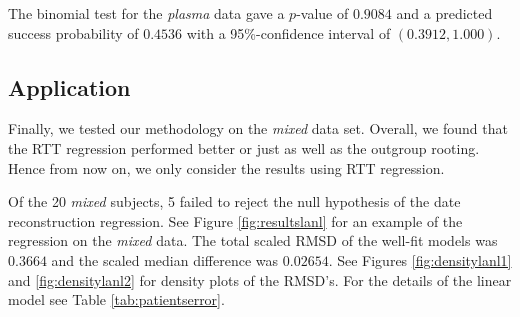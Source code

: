 \documentclass[12pt]{article}
\begin{document}
The binomial test for the \emph{plasma} data gave a $p$-value of $0.9084$ and a predicted success probability of $0.4536$ with a 95\%-confidence interval of $(0.3912, 1.000)$.

\subsection * {Application} \label{sec:mixed_data}




Finally, we tested our methodology on the {\em mixed} data set.
Overall, we found that the RTT regression performed better or just as well as the outgroup rooting.
Hence from now on, we only consider the results using RTT regression.

Of the 20 \emph{mixed} subjects, 5 failed to reject the null hypothesis of the date reconstruction regression.
See Figure \ref{fig:resultslanl} for an example of the regression on the \emph{mixed} data.
The total scaled RMSD of the well-fit models was $0.3664$ and the scaled median difference was $0.02654$.
See Figures \ref{fig:densitylanl1} and \ref{fig:densitylanl2} for density plots of the RMSD's.
For the details of the linear model see Table \ref{tab:patientserror}.
\end{document}
